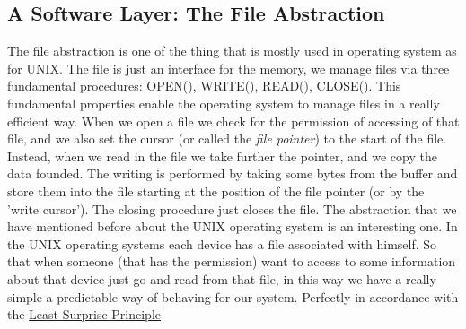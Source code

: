 \documentclass{article}
\begin{document}
    \subsection{A Software Layer: The File Abstraction}
      The file abstraction is one of the thing that is mostly used in 
      operating system as for UNIX. The file is just an interface for the 
      memory, we manage files via three fundamental procedures: OPEN(), WRITE(),
      READ(), CLOSE(). This fundamental properties enable the operating system to manage
      files in a really efficient way. When we open a file we check for the permission 
      of accessing of that file, and we also set the cursor (or called the \textit{file pointer}) 
      to the start of the file. Instead, when we read in the file we take further the pointer, and we copy the data founded.
      The writing is performed by taking some bytes from the buffer and store them into 
      the file starting at the position of the file pointer (or by the 'write cursor').
      The closing procedure just closes the file. The abstraction that we have 
      mentioned before about the UNIX operating system is an interesting one. In the 
      UNIX operating systems each device has a file associated with himself. So that 
      when someone (that has the permission) want to access to some information about
      that device just go and read from that file, in this way we have a really 
      simple a predictable way of behaving for our system. Perfectly in accordance with
      the \underline{Least Surprise Principle}
\end{document}
